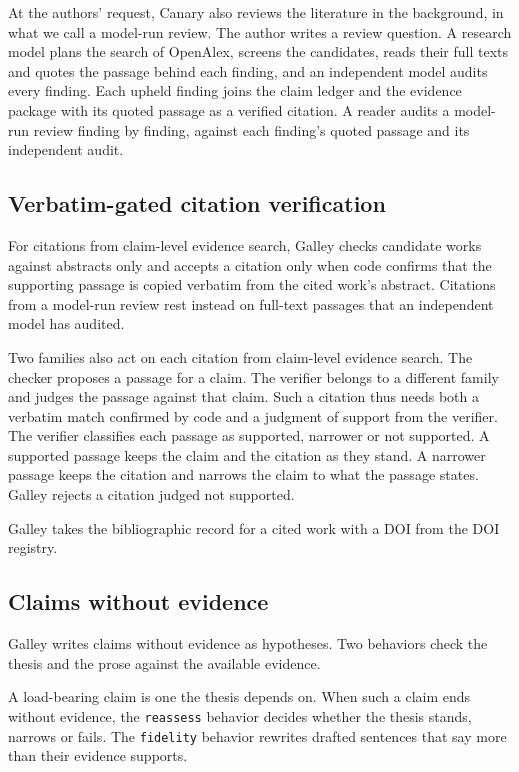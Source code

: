 \documentclass[
]{article}
\begin{document}
At the authors' request, Canary also reviews the literature in the
background, in what we call a model-run review. The author writes a
review question. A research model plans the search of OpenAlex, screens
the candidates, reads their full texts and quotes the passage behind
each finding, and an independent model audits every finding. Each upheld
finding joins the claim ledger and the evidence package with its quoted
passage as a verified citation. A reader audits a model-run review
finding by finding, against each finding's quoted passage and its
independent audit.

\subsection{Verbatim-gated citation
verification}\label{verbatim-gated-citation-verification}

For citations from claim-level evidence search, Galley checks candidate
works against abstracts only and accepts a citation only when code
confirms that the supporting passage is copied verbatim from the cited
work's abstract. Citations from a model-run review rest instead on
full-text passages that an independent model has audited.

Two families also act on each citation from claim-level evidence search.
The checker proposes a passage for a claim. The verifier belongs to a
different family and judges the passage against that claim. Such a
citation thus needs both a verbatim match confirmed by code and a
judgment of support from the verifier. The verifier classifies each
passage as supported, narrower or not supported. A supported passage
keeps the claim and the citation as they stand. A narrower passage keeps
the citation and narrows the claim to what the passage states. Galley
rejects a citation judged not supported.

Galley takes the bibliographic record for a cited work with a DOI from
the DOI registry.

\subsection{Claims without evidence}\label{claims-without-evidence}

Galley writes claims without evidence as hypotheses. Two behaviors check
the thesis and the prose against the available evidence.

A load-bearing claim is one the thesis depends on. When such a claim
ends without evidence, the \texttt{reassess} behavior decides whether
the thesis stands, narrows or fails. The \texttt{fidelity} behavior
rewrites drafted sentences that say more than their evidence supports.
\end{document}
